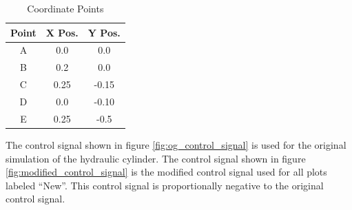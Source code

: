  \begin{table}[H]
\begin{tabular}{||c c c ||} 
 \hline
 Point & X Pos. & Y Pos. \\ [0.5ex] 
 \hline\hline
 A & 0.0 & 0.0 \\
 B & 0.2 & 0.0 \\
 C & 0.25 & -0.15 \\
 D & 0.0 & -0.10 \\
 E & 0.25 & -0.5 \\ [1ex] 
 \hline
\end{tabular}
\caption{Coordinate Points}
\label{tab:points}
\end{table}

The control signal shown in figure \ref{fig:og_control_signal} is used for the original simulation of the hydraulic cylinder. The control signal shown in figure \ref{fig:modified_control_signal} is the modified control signal used for all plots labeled ``New''. This control signal is proportionally negative to the original control signal.



